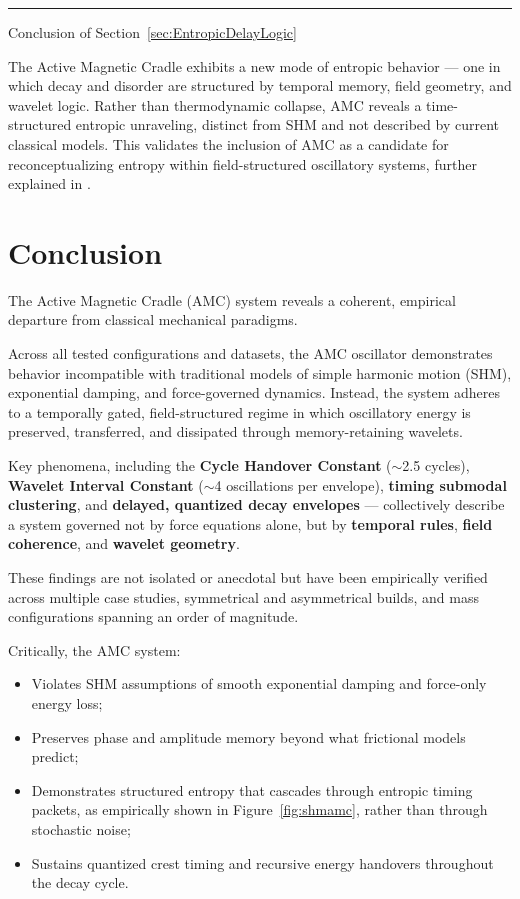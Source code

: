 \documentclass[10pt,aps,pre,onecolumn,superscriptaddress,notitlepage]{revtex4-2}
\begin{document}
\vspace{1em}
\hrule
\vspace{1em}

Conclusion of Section~\ref{sec:EntropicDelayLogic}

The Active Magnetic Cradle exhibits a new mode of entropic behavior — one in which decay and disorder are structured by temporal memory, field geometry, and wavelet logic. Rather than thermodynamic collapse, AMC reveals a time-structured entropic unraveling, distinct from SHM and not described by current classical models. This validates the inclusion of AMC as a candidate for reconceptualizing entropy within field-structured oscillatory systems, further explained in \cite{karim2025fieldthermo}. 



\section{Conclusion}
\label{sec:Conclusion}


The Active Magnetic Cradle (AMC) system reveals a coherent, empirical departure from classical mechanical paradigms.

Across all tested configurations and datasets, the AMC oscillator demonstrates behavior incompatible with traditional models of simple harmonic motion (SHM), exponential damping, and force-governed dynamics. Instead, the system adheres to a temporally gated, field-structured regime in which oscillatory energy is preserved, transferred, and dissipated through memory-retaining wavelets.

Key phenomena, including the \textbf{Cycle Handover Constant} ($\sim$2.5 cycles), \textbf{Wavelet Interval Constant} ($\sim$4 oscillations per envelope), \textbf{timing submodal clustering}, and \textbf{delayed, quantized decay envelopes} — collectively describe a system governed not by force equations alone, but by \textbf{temporal rules}, \textbf{field coherence}, and \textbf{wavelet geometry}.

These findings are not isolated or anecdotal but have been empirically verified across multiple case studies, symmetrical and asymmetrical builds, and mass configurations spanning an order of magnitude.

Critically, the AMC system:
\begin{itemize}
    \item Violates SHM assumptions of smooth exponential damping and force-only energy loss;
    \item Preserves phase and amplitude memory beyond what frictional models predict;
    \item Demonstrates structured entropy that cascades through entropic timing packets, as empirically shown in Figure~\ref{fig:shmamc}, rather than through stochastic noise;
    \item Sustains quantized crest timing and recursive energy handovers throughout the decay cycle.
\end{itemize}
\end{document}
